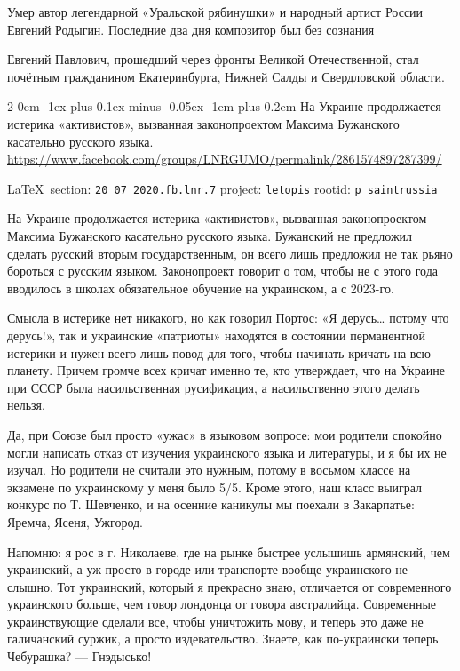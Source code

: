 \documentclass[a4paper,11pt]{extreport}
\makeatletter
\renewcommand\subsection{%
  \clearpage
    \@startsection{subsection}%
    {2}%
    {0em}%
    {-1ex plus 0.1ex minus -0.05ex}%
    {-1em plus 0.2em}%
    {\scshape\bfseries\Large}%
}
\makeatother
\begin{document}
Умер автор легендарной «Уральской рябинушки» и народный артист России Евгений Родыгин.
Последние два дня композитор был без сознания

Евгений Павлович, прошедший через фронты Великой Отечественной, стал почётным гражданином Екатеринбурга, Нижней Салды и Свердловской области. 
 
 

\subsection{
На Украине продолжается истерика «активистов», вызванная законопроектом Максима Бужанского касательно русского языка.}
\url{https://www.facebook.com/groups/LNRGUMO/permalink/2861574897287399/}
  
\vspace{0.5cm}
{\small\LaTeX~section: \verb|20_07_2020.fb.lnr.7| project: \verb|letopis| rootid: \verb|p_saintrussia|}
\vspace{0.5cm}

На Украине продолжается истерика «активистов», вызванная законопроектом Максима
Бужанского касательно русского языка. Бужанский не предложил сделать русский
вторым государственным, он всего лишь предложил не так рьяно бороться с русским
языком. Законопроект говорит о том, чтобы не с этого года вводилось в школах
обязательное обучение на украинском, а с 2023-го.

Смысла в истерике нет никакого, но как говорил Портос: «Я дерусь… потому что
дерусь!», так и украинские «патриоты» находятся в состоянии перманентной
истерики и нужен всего лишь повод для того, чтобы начинать кричать на всю
планету. Причем громче всех кричат именно те, кто утверждает, что на Украине
при СССР была насильственная русификация, а насильственно этого делать нельзя.

Да, при Союзе был просто «ужас» в языковом вопросе: мои родители спокойно могли
написать отказ от изучения украинского языка и литературы, и я бы их не изучал.
Но родители не считали это нужным, потому в восьмом классе на экзамене по
украинскому у меня было 5/5. Кроме этого, наш класс выиграл конкурс по Т.
Шевченко, и на осенние каникулы мы поехали в Закарпатье: Яремча, Ясеня,
Ужгород.

Напомню: я рос в г. Николаеве, где на рынке быстрее услышишь армянский, чем
украинский, а уж просто в городе или транспорте вообще украинского не слышно.
Тот украинский, который я прекрасно знаю, отличается от современного
украинского больше, чем говор лондонца от говора австралийца. Современные
украинствующие сделали все, чтобы уничтожить мову, и теперь это даже не
галичанский суржик, а просто издевательство. Знаете, как по-украински теперь
Чебурашка? --- Гнэдысько!
\end{document}

